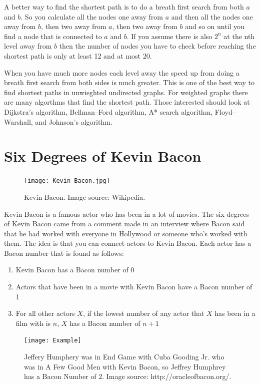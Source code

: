 A better way to find the shortest path is to do a breath first search from both $a$ and $b$. So you calculate all the nodes one away from $a$ and then all the nodes one away from $b$, then two away from $a$, then two away from $b$ and so on until you find a node that is connected to $a$ and $b$. If you assume there is also $2^n$ at the nth level away from $b$ then the number of nodes you have to check before reaching the shortest path is only at least 12 and at most 20.

When you have much more nodes each level away the speed up from doing a breath first search from both sides is much greater. This is one of the best way to find shortest paths in unwieghted undirected graphs. For weighted graphs there are many algorthms that find the shortest path. Those interested should look at Dijkstra's algorithm, Bellman–Ford algorithm, A* search algorithm, Floyd–Warshall, and Johnson's algorithm.


\section*{Six Degrees of Kevin Bacon}
\begin{figure}[h]
\texttt{[image: Kevin\_Bacon.jpg]}
\caption{Kevin Bacon.  Image source: Wikipedia.}
\end{figure}

Kevin Bacon is a famous actor who has been in a lot of movies. The six degrees of Kevin Bacon came from a comment made in an interview where Bacon said that he had worked with everyone in Hollywood or someone who's worked with them.  The idea is that you can connect actors to Kevin Bacon. Each actor has a Bacon number that is found as follows:
\begin{enumerate}
\item Kevin Bacon has a Bacon number of 0
\item Actors that have been in a movie with Kevin Bacon have a Bacon number of 1
\item For all other actors $X$, if the lowest number of any actor that $X$ has been in a film with is $n$, $X$ has a Bacon number of $n+1$
\end{enumerate}

\begin{figure}[h]
\texttt{[image: Example]}
\caption{Jeffery Humphery was in End Game with Cuba Gooding Jr. who was in A Few Good Men with Kevin Bacon, so Jeffrey Humphrey has a Bacon Number of 2.  Image source: http://oracleofbacon.org/.}
\end{figure}

